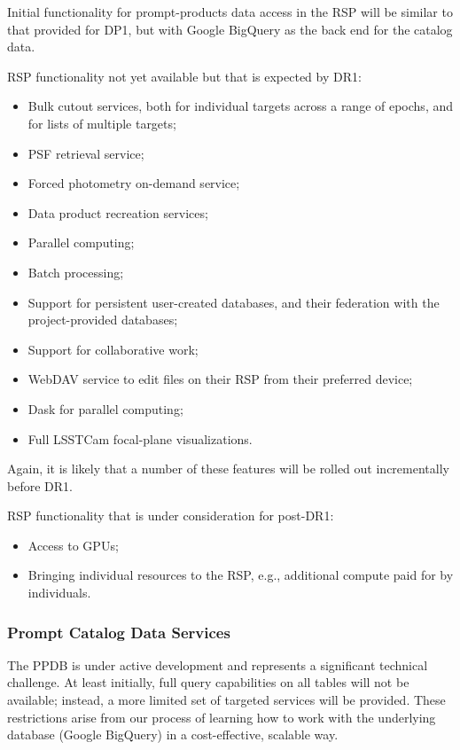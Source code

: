 Initial functionality for prompt-products data access in the RSP will be similar to that provided for DP1, but with Google BigQuery as the back end for the catalog data.

RSP functionality not yet available but that is expected by DR1:
\begin{itemize}
\item Bulk cutout services, both for individual targets across a range of epochs, and for lists of multiple targets;
\item PSF retrieval service;
\item Forced photometry on-demand service;
\item Data product recreation services;
\item Parallel computing;
\item Batch processing;
\item Support for persistent user-created databases, and their federation with the project-provided databases;
\item Support for collaborative work;
\item WebDAV service to edit files on their RSP from their preferred device;
\item Dask for parallel computing;
\item Full LSSTCam focal-plane visualizations.
\end{itemize}
Again, it is likely that a number of these features will be rolled out incrementally before DR1.

RSP functionality that is under consideration for post-DR1:
\begin{itemize}
\item Access to GPUs;
\item Bringing individual resources to the RSP, e.g., additional compute paid for by individuals.
\end{itemize}

\subsubsection{Prompt Catalog Data Services}
\label{ssec:prompt_access}

The PPDB is under active development and represents a significant technical challenge.
At least initially, full query capabilities on all tables will not be available; instead, a more limited set of targeted services will be provided.
These restrictions arise from our process of learning how to work with the underlying database (Google BigQuery) in a cost-effective, scalable way.

